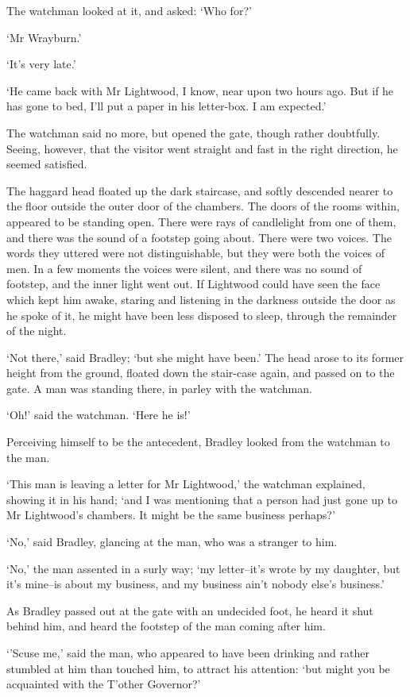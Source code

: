 The watchman looked at it, and asked: ‘Who for?’

‘Mr Wrayburn.’

‘It’s very late.’

‘He came back with Mr Lightwood, I know, near upon two hours ago. But if
he has gone to bed, I’ll put a paper in his letter-box. I am expected.’

The watchman said no more, but opened the gate, though rather
doubtfully. Seeing, however, that the visitor went straight and fast in
the right direction, he seemed satisfied.

The haggard head floated up the dark staircase, and softly descended
nearer to the floor outside the outer door of the chambers. The doors
of the rooms within, appeared to be standing open. There were rays of
candlelight from one of them, and there was the sound of a footstep
going about. There were two voices. The words they uttered were not
distinguishable, but they were both the voices of men. In a few moments
the voices were silent, and there was no sound of footstep, and the
inner light went out. If Lightwood could have seen the face which kept
him awake, staring and listening in the darkness outside the door as
he spoke of it, he might have been less disposed to sleep, through the
remainder of the night.

‘Not there,’ said Bradley; ‘but she might have been.’ The head arose to
its former height from the ground, floated down the stair-case again,
and passed on to the gate. A man was standing there, in parley with the
watchman.

‘Oh!’ said the watchman. ‘Here he is!’

Perceiving himself to be the antecedent, Bradley looked from the
watchman to the man.

‘This man is leaving a letter for Mr Lightwood,’ the watchman explained,
showing it in his hand; ‘and I was mentioning that a person had just
gone up to Mr Lightwood’s chambers. It might be the same business
perhaps?’

‘No,’ said Bradley, glancing at the man, who was a stranger to him.

‘No,’ the man assented in a surly way; ‘my letter--it’s wrote by my
daughter, but it’s mine--is about my business, and my business ain’t
nobody else’s business.’

As Bradley passed out at the gate with an undecided foot, he heard it
shut behind him, and heard the footstep of the man coming after him.

‘’Scuse me,’ said the man, who appeared to have been drinking and rather
stumbled at him than touched him, to attract his attention: ‘but might
you be acquainted with the T’other Governor?’

